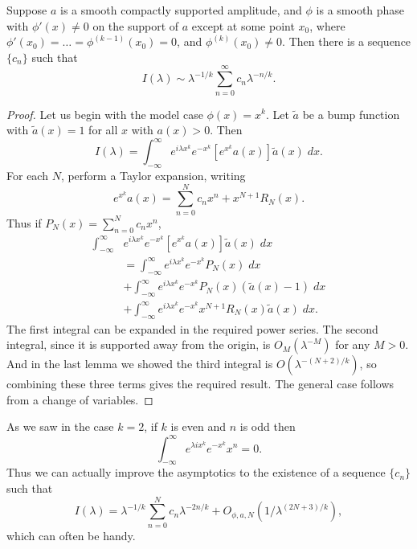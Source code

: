 \begin{theorem}
  Suppose $a$ is a smooth compactly supported amplitude, and $\phi$ is a smooth phase with $\phi'(x) \neq 0$ on the support of $a$ except at some point $x_0$, where $\phi'(x_0) = \dots = \phi^{(k-1)}(x_0) = 0$, and $\phi^{(k)}(x_0) \neq 0$. Then there is a sequence $\{ c_n \}$ such that
  \[ I(\lambda) \sim \lambda^{-1/k} \sum_{n = 0}^\infty c_n \lambda^{-n/k}. \]
\end{theorem}
\begin{proof}
  Let us begin with the model case $\phi(x) = x^k$. Let $\tilde{a}$ be a bump function with $\tilde{a}(x) = 1$ for all $x$ with $a(x) > 0$. Then
  \[ I(\lambda) = \int_{-\infty}^\infty e^{i \lambda x^k} e^{-x^k} [e^{x^k} a(x)] \tilde{a}(x)\; dx. \]
  For each $N$, perform a Taylor expansion, writing
  \[ e^{x^k} a(x) = \sum_{n = 0}^N c_n x^n + x^{N+1} R_N(x). \]
  Thus if $P_N(x) = \sum_{n = 0}^N c_n x^n$,
  \begin{align*}
    \int_{-\infty}^\infty &e^{i \lambda x^k} e^{-x^k} [e^{x^k} a(x)] \tilde{a}(x)\; dx\\
    & = \int_{-\infty}^\infty e^{i \lambda x^k} e^{-x^k} P_N(x)\; dx\\
    & + \int_{-\infty}^\infty e^{i \lambda x^k} e^{-x^k} P_N(x) (\tilde{a}(x) - 1)\; dx\\
    & + \int_{-\infty}^\infty e^{i \lambda x^k} e^{-x^k} x^{N+1} R_N(x) \tilde{a}(x)\; dx.
  \end{align*}
  The first integral can be expanded in the required power series. The second integral, since it is supported away from the origin, is $O_M(\lambda^{-M})$ for any $M > 0$. And in the last lemma we showed the third integral is $O(\lambda^{-(N+2)/k})$, so combining these three terms gives the required result. The general case follows from a change of variables.
\end{proof}

\begin{remark}
  As we saw in the case $k = 2$, if $k$ is even and $n$ is odd then
  \[ \int_{-\infty}^\infty e^{\lambda i x^k} e^{-x^k} x^n = 0. \]
  Thus we can actually improve the asymptotics to the existence of a sequence $\{ c_n \}$ such that
  \[ I(\lambda) = \lambda^{-1/k} \sum_{n = 0}^N c_n \lambda^{-2n/k} + O_{\phi,a,N} \left( 1 / \lambda^{(2N + 3)/k} \right), \]
  which can often be handy.
\end{remark}

